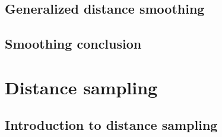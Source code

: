 \documentclass[12pt]{report}
\begin{document}
\chapter{Generalized distance smoothing}
%



\chapter{Smoothing conclusion}


\part{Distance sampling}

\chapter{Introduction to distance sampling}

\end{document}
